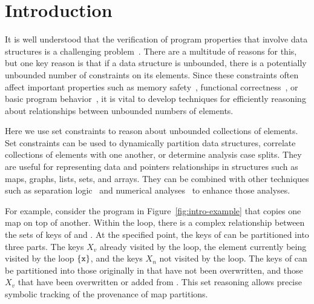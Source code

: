 \section{Introduction}
\label{s:1:intro}
It is well understood that the verification of program properties that
involve data structures is a challenging problem~\cite{jahob:thesis:07,compass:popl:11,fixbag:cav:11,celia:vmcai:12,ab:ecoop:13,hoo:14:sas,memcad:15:sas}.
There are a multitude of reasons for this, but one key reason is that
if a data structure is unbounded, there is a potentially unbounded number of constraints on its elements.  Since these constraints often affect important properties such as memory safety~\cite{memcad:15:sas}, functional correctness~\cite{fixbag:cav:11}, or basic program behavior~\cite{hoo:14:sas}, it is vital to develop techniques for efficiently reasoning about relationships between unbounded numbers of elements.

Here we use set constraints to reason about unbounded collections of elements.  Set constraints can be used to dynamically partition data structures, correlate collections of elements with one another, or determine analysis case splits.  They are useful for representing data and pointers relationships in structures such as maps, graphs, lists, sets, and arrays.  They can be combined with other techniques such as separation logic~\cite{hoo:14:sas,memcad:15:sas} and numerical analyses~\cite{quicr:cav:14} to enhance those analyses.

For example, consider the program in Figure~\ref{fig:intro-example}
that copies one map on top of another.
Within the loop, there is a complex relationship between the sets of
keys of  and .
At the specified point, the keys of  can be partitioned into
three parts.
The keys $X_v$ already visited by the loop, the element currently being
visited by the loop $\{\texttt{x}\}$, and the keys $X_n$ not visited by
the loop.
The keys of  can be partitioned into those originally in
 that have not been overwritten, and those $X_v$ that have
been overwritten or added from .
This set reasoning allows precise symbolic tracking of the provenance
of map partitions.

